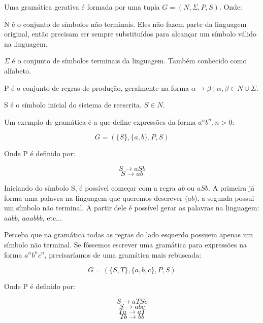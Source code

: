 \documentclass[a4paper,12pt,oneside,onecolumn]{uerj}
\begin{document}
Uma gramática gerativa é formada por uma tupla $G = (N, \Sigma, P, S)$. Onde:

\begin{lcircp}
    \item N é o conjunto de símbolos não terminais. Eles não fazem parte da linguagem original, então precisam ser sempre substituídos para alcançar um símbolo válido na linguagem.
    \item $\Sigma$ é o conjunto de símbolos terminais da linguagem. Também conhecido como alfabeto.
    \item P é o conjunto de regras de produção, geralmente na forma $\alpha \rightarrow \beta \mid \alpha, \beta \in N \cup \Sigma$.
    \item S é o símbolo inicial do sistema de reescrita. $S \in N$.
\end{lcircp}

Um exemplo de gramática é a que define expressões da forma $a^nb^n, n>0$:

\begin{equation*}
	G = ({\{S\}, \{a,b\}, P, S})
\end{equation*}

Onde P é definido por:

\begin{equation*}
	S \rightarrow aSb
\end{equation*}
\begin{equation*}
	S \rightarrow ab
\end{equation*}

Iniciando do símbolo S, é possível começar com a regra $ab$ ou $aSb$. A primeira já forma uma palavra na linguagem que queremos descrever ($ab$), a segunda possui um símbolo não terminal. A partir dele é possível gerar as palavras na linguagem: $aabb$, $aaabbb$, etc...

Perceba que na gramática todas as regras do lado esquerdo possuem apenas um símbolo não terminal. Se fôssemos escrever uma gramática para expressões na forma $a^nb^nc^n$, precisaríamos de uma gramática mais rebuscada:

\begin{equation*}
	G = (\{S, T\}, \{a,b,c\}, P, S)
\end{equation*}

Onde P é definido por:

\begin{equation*}
	S \rightarrow aTSc
\end{equation*}
\begin{equation*}
	S \rightarrow abc
\end{equation*}
\begin{equation*}
	Ta \rightarrow aT
\end{equation*}
\begin{equation*}
	Tb \rightarrow bb
\end{equation*}
\end{document}
